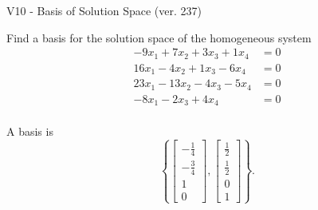 \begin{exercise}
  \begin{exerciseTitle}V10 - Basis of Solution Space (ver. 237)\end{exerciseTitle}
  \begin{exerciseStatement}
    Find a basis for the solution space of the homogeneous system 
\begin{align*}
 -9 x_ 1 + 7 x_ 2 + 3 x_ 3 + 1 x_ 4 &= 0  \\ 
  16 x_ 1 -4 x_ 2 + 1 x_ 3 -6 x_ 4 &= 0  \\ 
  23 x_ 1 -13 x_ 2 -4 x_ 3 -5 x_ 4 &= 0  \\ 
  -8 x_ 1 -2 x_ 3 + 4 x_ 4 &= 0  \\ 
 \end{align*}


 
  \end{exerciseStatement}

  \begin{exerciseAnswer}
   A basis is   
\[\left\{\left[\begin{array}{c}
-\frac{1}{4} \\
-\frac{3}{4} \\
1 \\
0
\end{array}\right] , \left[\begin{array}{c}
\frac{1}{2} \\
\frac{1}{2} \\
0 \\
1
\end{array}\right]\right\}.\]

  


  \end{exerciseAnswer}
\end{exercise}